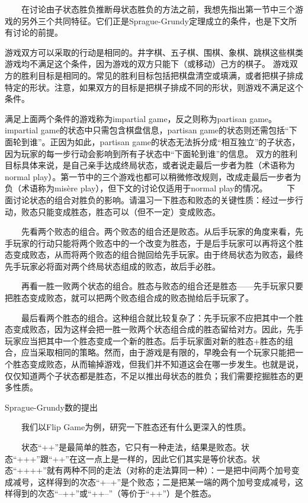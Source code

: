 　　在讨论由子状态胜负推断母状态胜负的方法之前，我想先指出第一节中三个游戏的另外三个共同特征。它们正是Sprague-Grundy定理成立的条件，也是下文所有讨论的前提。

游戏双方可以采取的行动是相同的。井字棋、五子棋、围棋、象棋、跳棋这些棋类游戏均不满足这个条件，因为游戏的双方只能下（或移动）己方的棋子。
游戏双方的胜利目标是相同的。常见的胜利目标包括把棋盘清空或填满，或者把棋子排成特定的形状。注意，如果双方的目标是把棋子排成不同的形状，则游戏不满足这个条件。

满足上面两个条件的游戏称为impartial game，反之则称为partisan game。impartial game的状态中只需包含棋盘信息，partisan game的状态则还需包括“下面轮到谁”。正因为如此，partisan game的状态无法拆分成“相互独立”的子状态，因为玩家的每一步行动会影响到所有子状态中“下面轮到谁”的信息。
双方的胜利目标具体来说，是自己亲手达成终局状态，或者说走最后一步者为胜（术语称为normal play）。第一节中的三个游戏也都可以稍微修改规则，改成走最后一步者为负（术语称为misère play），但下文的讨论仅适用于normal play的情况。
　　下面讨论状态的组合对胜负的影响。请温习一下胜态和败态的关键性质：经过一步行动，败态只能变成胜态，胜态可以（但不一定）变成败态。

　　先看两个败态的组合。两个败态的组合还是败态。从后手玩家的角度来看，先手玩家的行动只能将两个败态中的一个改变为胜态，于是后手玩家可以再将这个胜态变成败态，从而将两个败态的组合抛回给先手玩家。由于终局状态为败态，最终先手玩家必将面对两个终局状态组成的败态，故后手必胜。

　　再看一胜一败两个状态的组合。胜态与败态的组合还是胜态——先手玩家只要把胜态变成败态，就可以把两个败态组合成的败态抛给后手玩家了。

　　最后看两个胜态的组合。这种组合就比较复杂了：先手玩家不应把其中一个胜态变成败态，因为这样会把一胜一败两个状态组合成的胜态留给对方。因此，先手玩家应当把其中一个胜态变成一个新的胜态。后手玩家面对新的胜态+胜态的组合，应当采取相同的策略。然而，由于游戏是有限的，早晚会有一个玩家只能把一个胜态变成败态，从而输掉游戏，但我们并不知道这会在哪一步发生。也就是说，仅仅知道两个子状态都是胜态，不足以推出母状态的胜负；我们需要挖掘胜态的更多性质。

Sprague-Grundy数的提出

　　我们以Flip Game为例，研究一下胜态还有什么更深入的性质。

　　状态“++”是最简单的胜态，它只有一种走法，结果是败态。状态“+++”跟“++”在这一点上是一样的，因此它们其实是等价状态。状态“++++”就有两种不同的走法（对称的走法算同一种）：一是把中间两个加号变成减号，这样得到的次态“+--+”是个败态；二是把某一端的两个加号变成减号，这样得到的次态“--++”或“++--”（等价于“++”）是个胜态。

